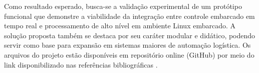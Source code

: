 Como resultado esperado, busca-se a validação experimental de um protótipo funcional que demonstre a viabilidade da integração entre controle embarcado em tempo real e processamento de alto nível em ambiente Linux embarcado. A solução proposta também se destaca por seu caráter modular e didático, podendo servir como base para expansão em sistemas maiores de automação logística. Os arquivos do projeto estão disponíveis em repositório online (GitHub) por meio do link disponibilizado nas referências bibliográficas \cite{ref:github_soe}.